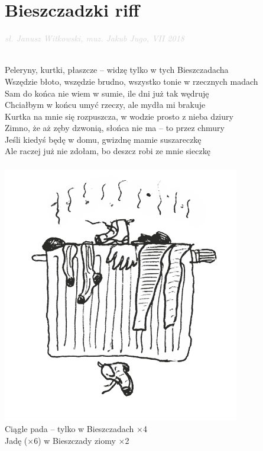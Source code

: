 \documentclass[a5paper, 10pt]{book}
\begin{document}
\section{Bieszczadzki riff}\textcolor{lightgray}{\textit{sł. Janusz Witkowski, muz. Jakub Jugo, VII 2018 }}\\~\\
\begin{minipage}[t]{1\textwidth}
Peleryny, kurtki, płaszcze – widzę tylko w tych Bieszczadach\hfill a\\
Wszędzie błoto, wszędzie brudno, wszystko tonie w rzecznych madach\\
Sam do końca nie wiem w sumie, ile dni już tak wędruję\\
Chciałbym w końcu umyć rzeczy, ale mydła mi brakuje\\
\hspace*{3mm}Kurtka na mnie się rozpuszcza, w wodzie prosto z nieba dziury\\
\hspace*{3mm}Zimno, że aż zęby dzwonią, słońca nie ma – to przez chmury\\
\hspace*{3mm}Jeśli kiedyś będę w domu, gwizdnę mamie suszareczkę\\
\hspace*{3mm}Ale raczej już nie zdołam, bo deszcz robi ze mnie sieczkę\\
\\
\includegraphics[height=0.3\textwidth, right]{images/bieszczadzki_riff_1.png}\vspace*{-0.3\textwidth}\\
\hspace*{10mm}Ciągle pada – tylko w Bieszczadach $\times$4\\
\hspace*{10mm}Jadę ($\times$6) w Bieszczady ziomy $\times$2\\


\end{minipage}
\end{document}
